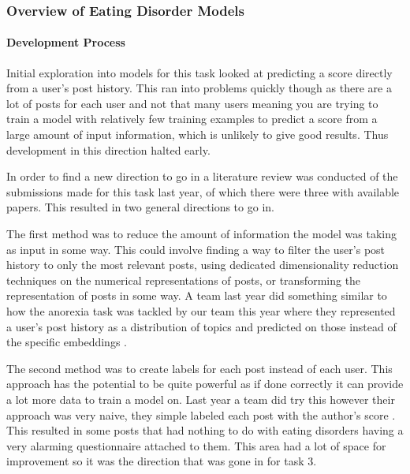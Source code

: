 \documentclass[12pt, titlepage]{article}
\begin{document}
\subsubsection{Overview of Eating Disorder Models}

\paragraph{Development Process\newline}

Initial exploration into models for this task looked at predicting a score directly from a user's post history. This ran into problems quickly though as there are a lot of posts for each user and not that many users meaning you are trying to train a model with relatively few training examples to predict a score from a large amount of input information, which is unlikely to give good results. Thus development in this direction halted early.

In order to find a new direction to go in a literature review was conducted of the submissions made for this task last year, of which there were three with available papers. This resulted in two general directions to go in.

The first method was to reduce the amount of information the model was taking as input in some way. This could involve finding a way to filter the user's post history to only the most relevant posts, using dedicated dimensionality reduction techniques on the numerical representations of posts, or transforming the representation of posts in some way. A team last year did something similar to how the anorexia task was tackled by our team this year where they represented a user's post history as a distribution of topics and predicted on those instead of the specific embeddings \citep{Grigore}.

The second method was to create labels for each post instead of each user. This approach has the potential to be quite powerful as if done correctly it can provide a lot more data to train a model on. Last year a team did try this however their approach was very naive, they simple labeled each post with the author's score \citep{Pan}. This resulted in some posts that had nothing to do with eating disorders having a very alarming questionnaire attached to them. This area had a lot of space for improvement so it was the direction that was gone in for task 3.
\end{document}
